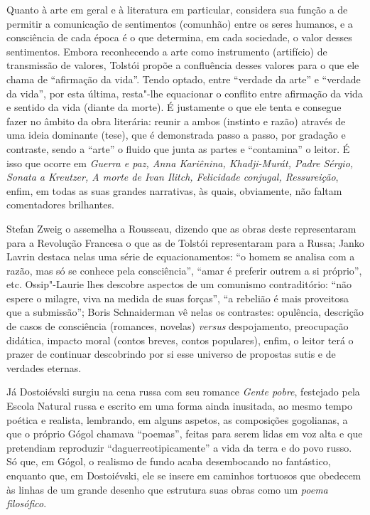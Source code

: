 Quanto à arte em geral e à literatura em particular, considera sua
função a de permitir a comunicação de sentimentos (comunhão) entre
os seres humanos, e a consciência de cada época é o que determina,
em cada sociedade, o valor desses sentimentos. Embora reconhecendo
a arte como instrumento (artifício) de transmissão de valores,
Tolstói propõe a confluência desses valores para o que ele chama
de ``afirmação da vida''. Tendo optado, entre ``verdade da arte''
e ``verdade da vida'', por esta última, resta"-lhe equacionar o
conflito entre afirmação da vida e sentido da vida (diante da
morte). É justamente o que ele tenta e consegue fazer no âmbito
da obra literária: reunir a ambos (instinto e razão) através de
uma ideia dominante (tese), que é demonstrada passo a passo, por
gradação e contraste, sendo a ``arte'' o fluido que junta as
partes e ``contamina'' o leitor. É isso que ocorre em \emph{Guerra
e paz, Anna Kariênina, Khadji-Murát, Padre Sérgio, Sonata a
Kreutzer, A morte de Ivan Ilitch, Felicidade conjugal,
Ressureição}, enfim, em todas as suas grandes narrativas, às
quais, obviamente, não faltam comentadores brilhantes.

Stefan Zweig o assemelha a Rousseau, dizendo que as obras deste representaram para a Revolução Francesa o que as de Tolstói representaram para a Russa; Janko Lavrin destaca nelas uma série de equacionamentos: ``o homem se analisa com a razão, mas só se conhece pela consciência'', ``amar é preferir outrem a si próprio'', etc. Ossip"-Laurie lhes descobre aspectos de um comunismo contraditório: ``não espere o milagre, viva na medida de suas forças'', ``a rebelião é mais proveitosa que a submissão''; Boris Schnaiderman vê nelas os contrastes: opulência, descrição de casos de consciência (romances, novelas) \emph{versus} despojamento, preocupação didática, impacto moral (contos breves, contos populares), enfim, o leitor terá o prazer de continuar descobrindo por si esse universo de propostas sutis e de verdades eternas.

Já Dostoiévski surgiu na cena russa com seu romance \emph{Gente pobre}, festejado pela Escola Natural russa e escrito em uma forma ainda inusitada, ao mesmo tempo poética e realista, lembrando, em alguns aspetos, as composições gogolianas, a que o próprio Gógol chamava ``poemas'', feitas para serem lidas em voz alta e que pretendiam reproduzir ``daguerreotipicamente'' a vida da terra e do povo russo. Só que, em Gógol, o realismo de fundo acaba desembocando no fantástico, enquanto que, em Dostoiévski, ele se insere em caminhos tortuosos que obedecem às linhas de um grande desenho que estrutura suas obras como um \emph{poema filosófico}.


